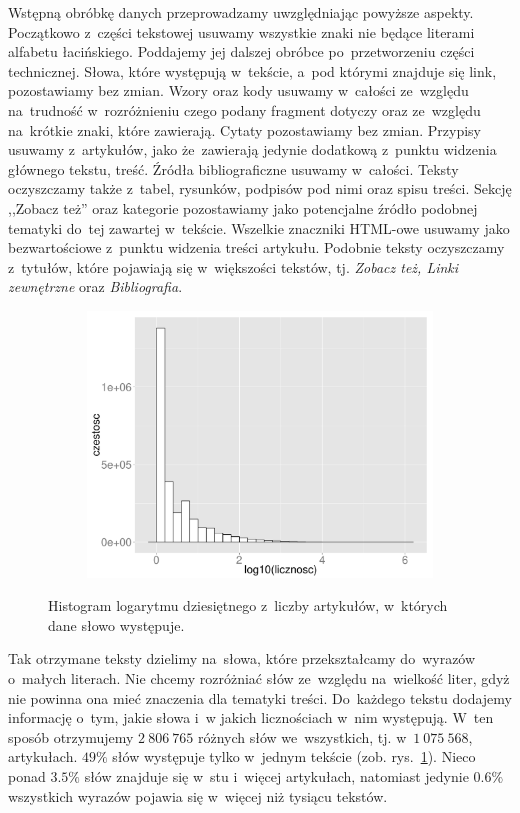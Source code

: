 \documentclass{praca1}
\begin{document}
Wstępną obróbkę danych przeprowadzamy uwzględniając powyższe aspekty. Początkowo z~części tekstowej usuwamy wszystkie znaki nie będące literami alfabetu łacińskiego. Poddajemy jej dalszej obróbce po~przetworzeniu części technicznej. Słowa, które występują w~tekście, a~pod którymi znajduje się link, pozostawiamy bez zmian. Wzory oraz kody usuwamy w~całości ze~względu na~trudność w~rozróżnieniu czego podany fragment dotyczy oraz ze~względu na~krótkie znaki, które zawierają. Cytaty pozostawiamy bez zmian. Przypisy usuwamy z~artykułów, jako że~zawierają jedynie dodatkową z~punktu widzenia głównego tekstu, treść. Źródła bibliograficzne usuwamy w~całości. Teksty oczyszczamy także z~tabel, rysunków, podpisów pod nimi oraz spisu treści. Sekcję ,,Zobacz też'' oraz kategorie pozostawiamy jako potencjalne źródło podobnej tematyki do~tej zawartej w~tekście. Wszelkie znaczniki HTML-owe usuwamy jako bezwartościowe z~punktu widzenia treści artykułu. Podobnie teksty oczyszczamy z~tytułów, które pojawiają się w~większości tekstów, tj. \emph{Zobacz też, Linki zewnętrzne} oraz \emph{Bibliografia}.

\begin{figure}[!h]
  \centering
  \includegraphics[width=350pt, height=200pt]{plot1.pdf}\\
  \caption{Histogram logarytmu dziesiętnego z~liczby artykułów, w~których dane słowo występuje.}\label{plot:001}
\end{figure}


Tak otrzymane teksty dzielimy na~słowa, które przekształcamy do~wyrazów o~małych literach. Nie chcemy rozróżniać słów ze~względu na~wielkość liter, gdyż nie powinna ona mieć znaczenia dla tematyki treści. Do~każdego tekstu dodajemy informację o~tym, jakie słowa i~w jakich licznościach w~nim występują. W~ten sposób otrzymujemy $2\ 806\ 765$ różnych słów we~wszystkich, tj. w~$1\ 075\ 568$, artykułach. $49\%$ słów występuje tylko w~jednym tekście (zob. rys.~\ref{plot:001}). Nieco ponad $3.5\%$ słów znajduje się w~stu i~więcej artykułach, natomiast jedynie $0.6\%$ wszystkich wyrazów pojawia się w~więcej niż tysiącu tekstów.
\end{document}
